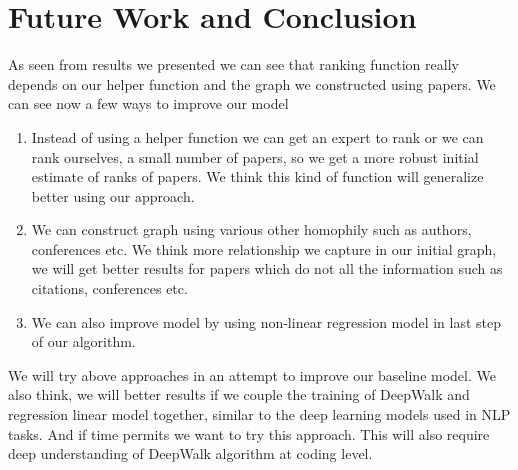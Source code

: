 \documentclass[a4paper, 11pt]{article}
\begin{document}
\section{Future Work and Conclusion}
As seen from results we presented we can see that ranking function really depends on our helper function and the graph we constructed using papers. We can see now a few ways to improve our model
\begin{enumerate}
\item Instead of using a helper function we can get an expert to rank or we can rank ourselves, a small number of papers, so we get a more robust initial estimate of ranks of papers. We think this kind of function will generalize better using our approach.
\item We can construct graph using various other homophily such as authors, conferences etc. We think more relationship we capture in our initial graph, we will get better results for papers which do not all the information such as citations, conferences etc.
\item We can also improve model by using non-linear regression model in last step of our algorithm.
\end{enumerate}
We will try above approaches in an attempt to improve our baseline model.
We also think, we will better results if we couple the training of DeepWalk and regression linear model together, similar to the deep learning models used in NLP tasks. And if time permits we want to try this approach. This will also require deep understanding of DeepWalk algorithm at coding level.
\end{document}
